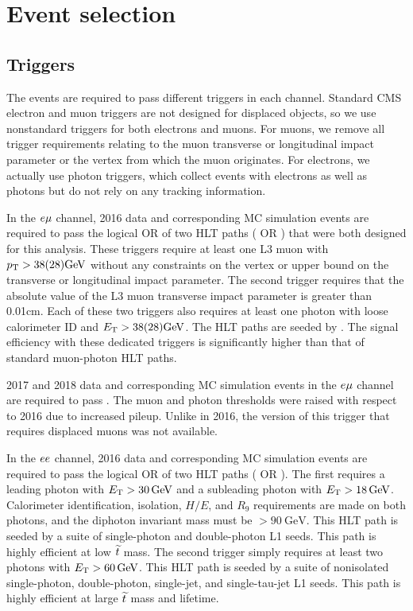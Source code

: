 \section{Event selection}
\label{selection}

\subsection{Triggers}
The events are required to pass different triggers in each channel. Standard CMS electron and muon triggers are not designed for displaced objects, so we use nonstandard triggers for both electrons and muons. For muons, we remove all trigger requirements relating to the muon transverse or longitudinal impact parameter or the vertex from which the muon originates. For electrons, we actually use photon triggers, which collect events with electrons as well as photons but do not rely on any tracking information.

In the $e{\mu}$ channel, 2016 data and corresponding MC simulation events are required to pass the logical OR of two HLT paths ( OR ) that were both designed for this analysis. These triggers require at least one L3 muon with $\pt>38(28)\si{\GeV}$ without any constraints on the vertex or upper bound on the transverse or longitudinal impact parameter. The second trigger requires that the absolute value of the L3 muon transverse impact parameter is greater than 0.01\unit{cm}. Each of these two triggers also requires at least one photon with loose calorimeter ID and $\ET>38(28)\si{\GeV}$. The HLT paths are seeded by . The signal efficiency with these dedicated triggers is significantly higher than that of standard muon-photon HLT paths.

2017 and 2018 data and corresponding MC simulation events in the $e{\mu}$ channel are required to pass . The muon \pt and photon \ET thresholds were raised with respect to 2016 due to increased pileup. Unlike in 2016, the version of this trigger that requires displaced muons was not available.

In the $ee$ channel, 2016 data and corresponding MC simulation events are required to pass the logical OR of two HLT paths ( OR  ). The first requires a leading photon with $E_{\mathrm{T}}>30\,\text{Ge\hspace{-.08em}V}$ and a subleading photon with $\ET>\SI{18}{\GeV}$. Calorimeter identification, isolation, $H/E$, and $R_9$ requirements are made on both photons, and the diphoton invariant mass must be $>\SI{90}{\GeV}$. This HLT path is seeded by a suite of single-photon and double-photon L1 seeds. This path is highly efficient at low $\widetilde{t}$ mass. The second trigger simply requires at least two photons with $\ET>\SI{60}{\GeV}$. This HLT path is seeded by a suite of nonisolated single-photon, double-photon, single-jet, and single-tau-jet L1 seeds. This path is highly efficient at large $\widetilde{t}$ mass and lifetime.

